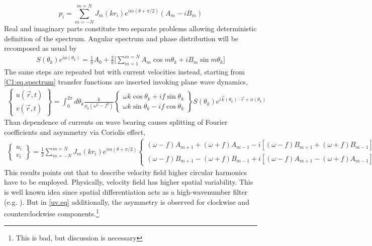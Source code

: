 \begin{equation}
\label{C1:p.eq}
p_i = \sum_{m = -N}^{m = N} J_m(k r_i) e^{im(\theta + \pi/2)} (A_m  - i B_m)
\end{equation}
Real and imaginary parts constitute two separate problems allowing deterministic definition of the spectrum. Angular spectrum and phase distribution will be recomposed as usual by
\begin{align*}
S(\theta_k) e^{i \phi(\theta_k)} = \frac{1}{\pi} A_0 + \frac{2}{\pi} \big[ \sum_{m = 1}^{m = N} A_m \cos m\theta_k + i B_m \sin m\theta_k \big]
\end{align*}
The same steps are repeated but with current velocities instead, starting from \eqref{C1:eq.spectrum} transfer functions are inserted invoking plane wave dynamics,
\begin{align}
\begin{Bmatrix}
u(\vec{r}, t) \\ v(\vec{r}, t)
\end{Bmatrix}
=\int_0^{2\pi} d \theta_k \frac{k}{\rho_0 (\omega^2 - f^2)} 
\begin{Bmatrix}
\omega k \cos \theta_k + i f \sin \theta_k \\ \omega k \sin \theta_k - i f \cos \theta_k
\end{Bmatrix}
S(\theta_k) e^{i \vec{k}(\theta_k) \cdot \vec{r} + \phi(\theta_k)}
\end{align}
Than dependence of currents on wave bearing causes splitting of Fourier coefficients and asymmetry via Coriolis effect,
\begin{align}
\label{C1:uv.eq}
\begin{Bmatrix}
u_i \\ v_i
\end{Bmatrix}
= \frac{1}{2} \sum_{m = -N}^{m = N} J_{m} (kr_i) e^{im(\theta + \pi/2)}
\begin{Bmatrix}
(\omega - f) A_{m + 1} + (\omega + f) A_{m - 1} - i [(\omega - f) B_{m + 1} + (\omega + f) B_{m - 1}] \\ 
(\omega - f) B_{m + 1} - (\omega + f) B_{m - 1} + i [ (\omega - f) A_{m + 1} - (\omega + f) A_{m - 1}]
\end{Bmatrix}
\end{align}
This results points out that to describe velocity field higher circular harmonics have to be employed. Physically, velocity field has higher spatial variability. This is well known idea since spatial differentiation acts as a high-wavenumber filter (e.g. \cite{rhines1977dynamics}). But in \eqref{uv.eq} additionally, the asymmetry is observed for clockwise and counterclockwise components.\footnote{This is bad, but discussion is necessary}

